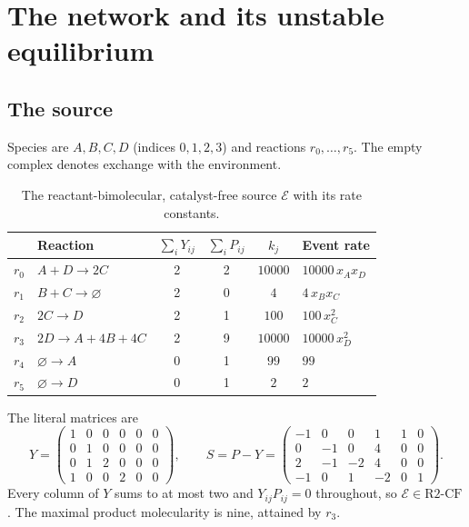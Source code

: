 \documentclass[11pt,a4paper]{article}
\theoremstyle{plain}
\theoremstyle{definition}
\theoremstyle{remark}
\newcommand{\Rcf}{\mathrm{R2\text{-}CF}}
\begin{document}
\section{The network and its unstable equilibrium}\label{sec:witness}

\subsection{The source}

Species are $A,B,C,D$ (indices $0,1,2,3$) and reactions $r_0,\dots,r_5$. The empty complex denotes exchange with the environment.

\begin{table}[ht]
\centering\small
\begin{tabular}{@{}clcccl@{}}
\toprule
& Reaction & $\sum_iY_{ij}$ & $\sum_iP_{ij}$ & $k_j$ & Event rate\\
\midrule
$r_0$ & $A+D\to2C$ & 2 & 2 & $10000$ & $10000\,x_Ax_D$\\
$r_1$ & $B+C\to\varnothing$ & 2 & 0 & $4$ & $4\,x_Bx_C$\\
$r_2$ & $2C\to D$ & 2 & 1 & $100$ & $100\,x_C^2$\\
$r_3$ & $2D\to A+4B+4C$ & 2 & 9 & $10000$ & $10000\,x_D^2$\\
$r_4$ & $\varnothing\to A$ & 0 & 1 & $99$ & $99$\\
$r_5$ & $\varnothing\to D$ & 0 & 1 & $2$ & $2$\\
\bottomrule
\end{tabular}
\caption{The reactant-bimolecular, catalyst-free source $\mathcal E$ with its rate constants.}
\label{tab:source}
\end{table}

The literal matrices are
\begin{equation}\label{eq:source}
Y=\begin{pmatrix}
1&0&0&0&0&0\\0&1&0&0&0&0\\0&1&2&0&0&0\\1&0&0&2&0&0
\end{pmatrix},\qquad
S=P-Y=\begin{pmatrix}
-1&0&0&1&1&0\\0&-1&0&4&0&0\\2&-1&-2&4&0&0\\-1&0&1&-2&0&1
\end{pmatrix}.
\end{equation}
Every column of $Y$ sums to at most two and $Y_{ij}P_{ij}=0$ throughout, so $\mathcal E\in\Rcf$. The maximal product molecularity is nine, attained by $r_3$.
\end{document}
